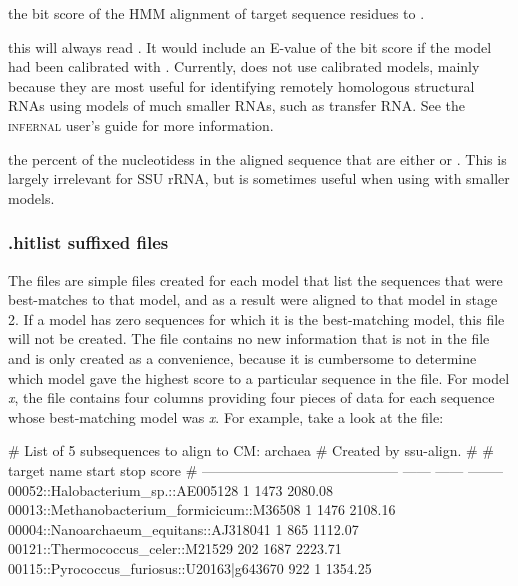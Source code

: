 \begin{wideitem}

\item[\emprog{bit sc}] the bit score of the HMM alignment of
  target sequence residues  to .

\item[\emprog{E-value}] this will always read \prog{-}. It would
  include an E-value of the bit score if the model had been calibrated
  with . Currently,  does not use
  calibrated models, mainly because they are most useful for
  identifying remotely homologous structural RNAs using models of
  much smaller RNAs, such as transfer RNA. See the \textsc{infernal} 
  user's guide \cite{Nawrocki09} for more information.

\item[\emprog{GC\%}] the percent of the nucleotidess in the aligned
  sequence that are either  or . This is largely
  irrelevant for SSU rRNA, but is sometimes useful when using
   with smaller models.
\end{wideitem}

\subsubsection{.hitlist suffixed files}

The  files are simple files created for each model
that list the sequences that were best-matches to that model, and as a
result were aligned to that model in stage 2. If a model has zero
sequences for which it is the best-matching model, this file will not
be created. The file contains no new information that is not in the
 file and is only created as a convenience, because it is
cumbersome to determine which model gave the highest score to a
particular sequence in the  file.  For model \emph{x}, the
 file contains four columns providing four pieces of
data for each sequence whose best-matching model was \emph{x}. For
example, take a look at the 
file:

\begin{sreoutput}
# List of 5 subsequences to align to CM: archaea
# Created by ssu-align.
#
# target name                                  start    stop     score
# ------------------------------------------  ------  ------  --------
  00052::Halobacterium_sp.::AE005128               1    1473   2080.08
  00013::Methanobacterium_formicicum::M36508       1    1476   2108.16
  00004::Nanoarchaeum_equitans::AJ318041           1     865   1112.07
  00121::Thermococcus_celer::M21529              202    1687   2223.71
  00115::Pyrococcus_furiosus::U20163|g643670     922       1   1354.25
\end{sreoutput}

